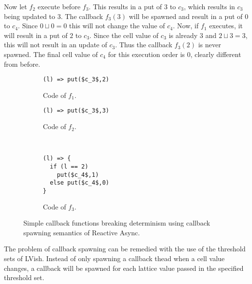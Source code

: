 Now let $f_2$ execute before $f_3$. This results in a put of $3$ to $c_3$, which
results in $c_3$ being updated to $3$. The callback $f_3(3)$ will be spawned and
result in a put of $0$ to $c_4$. Since $0 \sqcup 0 = 0$ this will not change the
value of $c_4$. Now, if $f_1$ executes, it will result in a put of $2$ to $c_3$.
Since the cell value of $c_3$ is already $3$ and $2 \sqcup 3 = 3$, this will not
result in an update of $c_3$. Thus the callback $f_3(2)$ is never spawned. The
final cell value of $c_4$ for this execution order is $0$, clearly different
from before.
\begin{figure}
  \begin{minipage}{0.5\textwidth}
    \begin{subfigure}[b]{\linewidth}
      \begin{lstlisting}
(l) => put($c_3$,2)
      \end{lstlisting}
      \caption{Code of $f_1$.}
    \end{subfigure}
    
    \begin{subfigure}[b]{\linewidth}
      \begin{lstlisting}
(l) => put($c_3$,3)
      \end{lstlisting}
      \caption{Code of $f_2$.}
    \end{subfigure}
  \end{minipage}
  ~
  \begin{minipage}{0.5\textwidth}
    \begin{subfigure}[b]{\linewidth}
      \begin{lstlisting}
(l) => {
  if (l == 2)
    put($c_4$,1)
  else put($c_4$,0)
}
      \end{lstlisting}
      \caption{Code of $f_3$.}
    \end{subfigure}
  \end{minipage}
  \caption{Simple callback functions breaking determinism using callback
  spawning semantics of Reactive Async.}
  \label{fig:ra_fun_callback_spawn}
\end{figure}

The problem of callback spawning can be remedied with the use of the threshold
sets of LVish. Instead of only spawning a callback thead when a cell value
changes, a callback will be spawned for each lattice value passed in the
specified threshold set.


